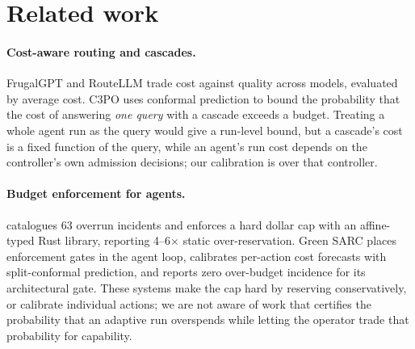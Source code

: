 \documentclass[11pt]{article}
\theoremstyle{remark}
\begin{document}
\section{Related work}

\paragraph{Cost-aware routing and cascades.}
FrugalGPT \citep{chen2023frugalgpt} and RouteLLM \citep{ong2024routellm} trade
cost against quality across models, evaluated by average cost. C3PO
\citep{valkanas2025c3po} uses conformal prediction to bound the probability
that the cost of answering \emph{one query} with a cascade exceeds a budget.
Treating a whole agent run as the query would give a run-level bound, but a
cascade's cost is a fixed function of the query, while an agent's run cost
depends on the controller's own admission decisions; our calibration is over
that controller.

\paragraph{Budget enforcement for agents.}
\citet{khan2026tokenbudgets} catalogues 63 overrun incidents and enforces a hard
dollar cap with an affine-typed Rust library, reporting 4--6$\times$ static
over-reservation. Green SARC \citep{besanson2026greensarc} places enforcement
gates in the agent loop, calibrates per-action cost forecasts with
split-conformal prediction, and reports zero over-budget incidence for its
architectural gate. These systems make the cap hard by reserving
conservatively, or calibrate individual actions; we are not aware of work that
certifies the probability that an adaptive run overspends while letting the
operator trade that probability for capability.
\end{document}
